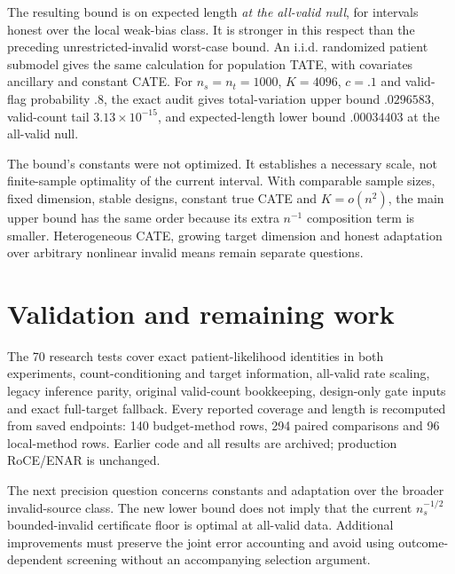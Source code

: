 \documentclass[11pt]{article}
\begin{document}
The resulting bound is on expected length \emph{at the all-valid null}, for
intervals honest over the local weak-bias class. It is stronger in this respect
than the preceding unrestricted-invalid worst-case bound. An i.i.d. randomized
patient submodel gives the same calculation for population TATE, with covariates
ancillary and constant CATE. For $n_s=n_t=1000$, $K=4096$, $c=.1$ and
valid-flag probability $.8$, the exact audit gives total-variation upper bound
$.0296583$, valid-count tail $3.13\times10^{-15}$, and expected-length lower
bound $.00034403$ at the all-valid null.

The bound's constants were not optimized. It establishes a necessary scale,
not finite-sample optimality of the current interval. With comparable sample
sizes, fixed dimension, stable designs, constant true CATE and $K=o(n^2)$,
the main upper bound has the same order because its extra $n^{-1}$ composition
term is smaller. Heterogeneous CATE, growing target dimension and honest
adaptation over arbitrary nonlinear invalid means remain separate questions.

\section{Validation and remaining work}

The 70 research tests cover exact patient-likelihood identities in both
experiments, count-conditioning and target information, all-valid rate scaling,
legacy inference parity, original valid-count bookkeeping, design-only gate
inputs and exact full-target fallback. Every reported coverage and length is
recomputed from saved endpoints: 140 budget-method rows, 294 paired comparisons
and 96 local-method rows. Earlier code and all results are archived; production
RoCE/ENAR is unchanged.

The next precision question concerns constants and adaptation over the broader
invalid-source class. The new lower bound does not imply that the current
$n_s^{-1/2}$ bounded-invalid certificate floor is optimal at all-valid data.
Additional improvements must preserve the joint error accounting and avoid
using outcome-dependent screening without an accompanying selection argument.
\end{document}

